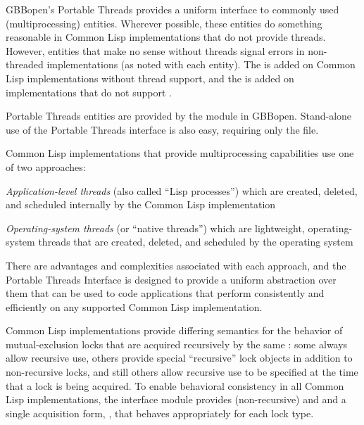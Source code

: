 
%
%
GBBopen's Portable Threads provides a uniform interface to commonly used
 (multiprocessing) entities.  Wherever possible, these entities
do something reasonable in Common Lisp implementations that do not provide
threads. However, entities that make no sense without threads signal errors in
non-threaded implementations (as noted with each entity).  The 
 is added on Common Lisp implementations without
thread support, and the   is
added on implementations that do not support \textbf{}.

Portable Threads entities are provided by the  module
in GBBopen.  Stand-alone use of the Portable Threads interface is also easy,
requiring only the
file.


Common Lisp implementations that provide multiprocessing capabilities use one
of two approaches:
\begin{tightitemize}
\item \textit{Application-level threads\/} (also called ``Lisp processes'') which are
  created, deleted, and scheduled internally by the Common Lisp implementation
\item \textit{Operating-system threads\/} (or ``native threads'') which are
  lightweight, operating-system threads that are created, deleted, and
  scheduled by the operating system
\end{tightitemize}

There are advantages and complexities associated with each approach, and the
Portable Threads Interface is designed to provide a uniform abstraction over
them that can be used to code applications that perform consistently and
efficiently on any supported Common Lisp implementation.


Common Lisp implementations provide differing semantics for the behavior of
mutual-exclusion locks that are acquired recursively by the same
: some always allow recursive use, others provide special
``recursive'' lock objects in addition to non-recursive locks, and still
others allow recursive use to be specified at the time that a lock is being
acquired.  To enable behavioral consistency in all Common Lisp
implementations, the  interface module provides
(non-recursive)  and  and a single
acquisition form, \textbf{}, that behaves
appropriately for each lock type.

